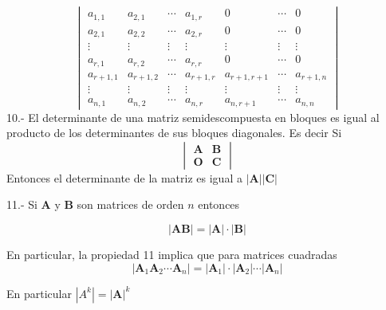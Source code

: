 \documentclass[
]{article}
\begin{document}
\begin{equation}
  \begin{vmatrix}
     a_{1,1}        &a_{2,1}    & \cdots     & a_{1,r}  & 0         & \cdots         & 0      \\ 
     a_{2,1}        &a_{2,2}    & \cdots     & a_{2,r}  & 0         & \cdots         & 0      \\
     \vdots         & \vdots    & \vdots     &  \vdots  & \vdots    & \vdots         & \vdots \\  
     a_{r,1}        &a_{r,2}    &\cdots      & a_{r,r}  & 0         & \cdots         & 0      \\
    a_{r+1,1}       &a_{r+1,2}  &\cdots      & a_{r+1,r}& a_{r+1,r+1} &\cdots        & a_{r+1,n}      \\
     \vdots         & \vdots    & \vdots     &  \vdots  &  \vdots       & \vdots     & \vdots      \\
     a_{n,1}        &a_{n,2}    & \cdots     & a_{n,r}  & a_{n,r+1}     & \cdots     & a_{n,n} 
  \end{vmatrix}
\end{equation} 10.- El determinante de una matriz semidescompuesta en
bloques es igual al producto de los determinantes de sus bloques
diagonales. Es decir Si \begin{equation}
  \begin{vmatrix}
     \mathbf{A}       &\mathbf{B}    \\ 
     \mathbf{O}       &\mathbf{C} 
      \end{vmatrix}
\end{equation} Entonces el determinante de la matriz es igual a
\(|\mathbf{A}||\mathbf{C}|\)

11.- Si \(\mathbf{A}\) y \(\mathbf{B}\) son matrices de orden \(n\)
entonces

\begin{equation}
  \left| \mathbf{A}\mathbf{B} \right| =   \left| \mathbf{A}  \right| \cdot   \left| \mathbf{B} \right|
\end{equation}

En particular, la propiedad 11 implica que para matrices cuadradas
\begin{equation}
  \left| \mathbf{A}_1\mathbf{A}_2\cdots\mathbf{A}_n \right| =   \left| \mathbf{A}_1  \right| \cdot      \left| \mathbf{A}_2 \right|\cdots\left| \mathbf{A}_n\right|
\end{equation}

En particular \(|A^{k}| = \left| \mathbf{A} \right|^{k}\)
\end{document}
